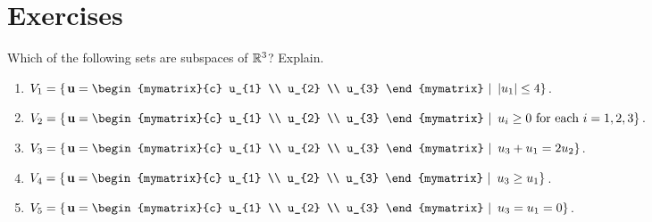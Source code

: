 \section*{Exercises}

\begin{ex}
  Which of the following sets are subspaces of $\mathbb{R}^3$? Explain.
  \begin{enumerate}
  \item $V_1=\set{\left.\vect{u}=\begin{mymatrix}{c}
          u_{1} \\ u_{2} \\ u_{3}
        \end{mymatrix}~\right\vert~ \abs{u_{1}} \leq 4}$.
  \item $V_2=\set{\left.\vect{u}=\begin{mymatrix}{c}
          u_{1} \\ u_{2} \\ u_{3}
        \end{mymatrix}~\right\vert~ u_{i}\geq 0\text{ for each }i=1,2,3}$.
  \item $V_3=\set{\left.\vect{u}=\begin{mymatrix}{c}
          u_{1} \\ u_{2} \\ u_{3}
        \end{mymatrix}~\right\vert~ u_{3}+u_{1}=2u_{2}}$.
  \item $V_4=\set{\left.\vect{u}=\begin{mymatrix}{c}
          u_{1} \\ u_{2} \\ u_{3}
        \end{mymatrix}~\right\vert~ u_{3}\geq u_{1}}$.
  \item $V_5=\set{\left.\vect{u}=\begin{mymatrix}{c}
          u_{1} \\ u_{2} \\ u_{3}
        \end{mymatrix}~\right\vert~ u_{3}=u_{1}=0}$.
  \end{enumerate}


\end{ex}
